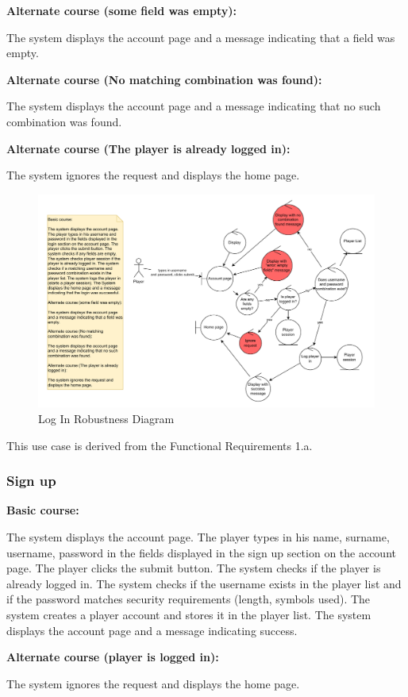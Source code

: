 \documentclass[11pt,a4paper]{article}
\newcommand{\heading}[1]{\vspace{1em}\noindent\textbf{#1}\par\vspace{0.5em}}
\begin{document}
\heading{Alternate course (some field was empty):}
The system displays the account page and a message indicating that a field was empty.

\heading{Alternate course (No matching combination was found):}
The system displays the account page and a message indicating that no such combination was found.

\heading{Alternate course (The player is already logged in):}
The system ignores the request and displays the home page.

\begin{figure}[H]
    \centering
    \includegraphics[width=1\textwidth,keepaspectratio]{robustness/log_in.drawio.pdf}
    \caption{Log In Robustness Diagram}
    \label{fig:log_in_robustness}
\end{figure}

This use case is derived from the Functional Requirements 1.a.

\subsubsection{Sign up}

\heading{Basic course:}
The system displays the account page. The player types in his name, surname, username, password in the fields displayed in the sign up section on the account page. The player clicks the submit button. The system checks if the player is already logged in. The system checks if the username exists in the player list and if the password matches security requirements (length, symbols used). The system creates a player account and stores it in the player list. The system displays the account page and a message indicating success.

\heading{Alternate course (player is logged in):}
The system ignores the request and displays the home page.
\end{document}
